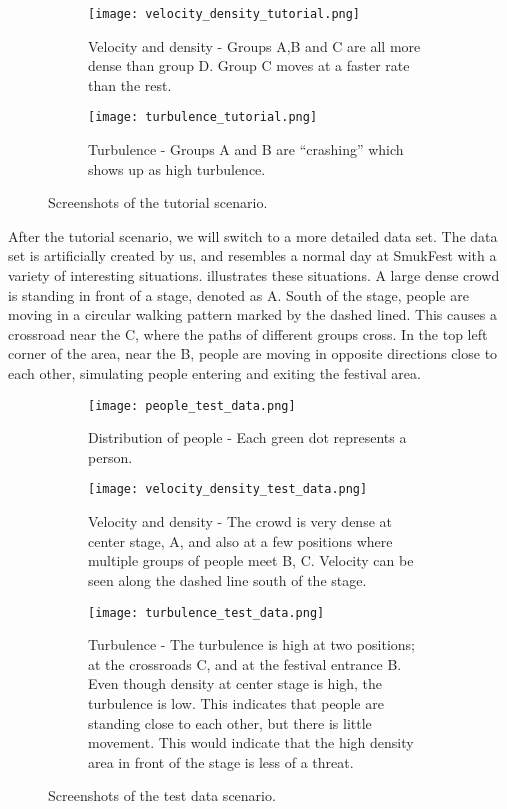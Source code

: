 \begin{figure}[htbp]
\begin{subfigure}[t]{.49\linewidth}
    \centering
    \texttt{[image: velocity\_density\_tutorial.png]}
    \caption{Velocity and density - Groups A,B and C are all more dense than group D. Group C moves at a faster rate than the rest.}
\end{subfigure}
\enspace
\begin{subfigure}[t]{.49\linewidth}
    \centering
    \texttt{[image: turbulence\_tutorial.png]}
    \caption{Turbulence - Groups A and B are \enquote{crashing} which shows up as high turbulence.}
\end{subfigure}
\caption{Screenshots of the tutorial scenario.}
\label{fig:tutorial_screens}
\end{figure}

After the tutorial scenario, we will switch to a more detailed data set. The data set is artificially created by us, and resembles a normal day at SmukFest with a variety of interesting situations.  illustrates these situations. A large dense crowd is standing in front of a stage, denoted as A. South of the stage, people are moving in a circular walking pattern marked by the dashed lined. This causes a crossroad near the C, where the paths of different groups cross. In the top left corner of the area, near the B, people are moving in opposite directions close to each other, simulating people entering and exiting the festival area.

\begin{figure}[htbp]
\begin{subfigure}[t]{.49\linewidth}
    \centering
    \texttt{[image: people\_test\_data.png]}
    \caption{Distribution of people - Each green dot represents a person.}
\end{subfigure}
\enspace
\begin{subfigure}[t]{.49\linewidth}
    \centering
    \texttt{[image: velocity\_density\_test\_data.png]}
    \caption{Velocity and density - The crowd is very dense at center stage, A, and also at a few positions where multiple groups of people meet B, C. Velocity can be seen along the dashed line south of the stage.}
\end{subfigure}
\enspace
\begin{subfigure}[t]{.49\linewidth}
    \centering
    \texttt{[image: turbulence\_test\_data.png]}
    \caption{Turbulence - The turbulence is high at two positions; at the crossroads C, and at the festival entrance B. Even though density at center stage is high, the turbulence is low. This indicates that people are standing close to each other, but there is little movement. This would indicate that the high density area in front of the stage is less of a threat.}
\end{subfigure}
\caption{Screenshots of the test data scenario.}
\label{fig:test_data_screens}
\end{figure}

